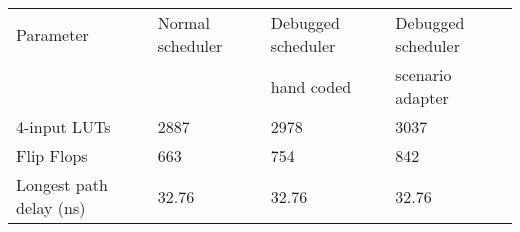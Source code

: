 
\begin{tabular}{llll}
\hline\noalign{\smallskip}
Parameter & Normal scheduler & Debugged scheduler & Debugged scheduler \\
 &  &  hand coded & scenario adapter \\
\noalign{\smallskip}
\hline
\noalign{\smallskip}
4-input LUTs & 2887 & 2978 & 3037 \\
Flip Flops & 663 & 754 & 842 \\
Longest path delay (ns) & 32.76 & 32.76 & 32.76 \\
\hline
\end{tabular}
